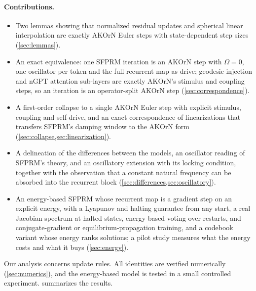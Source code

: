 \documentclass{article}
\theoremstyle{plain}
\theoremstyle{definition}
\theoremstyle{remark}
\begin{document}
\paragraph{Contributions.}
\begin{itemize}
  \item Two lemmas showing that normalized residual updates and spherical linear interpolation are
        exactly AKOrN Euler steps with state-dependent step sizes (\cref{sec:lemmas}).
  \item An exact equivalence: one SFPRM iteration is an AKOrN step with $\Omega=0$, one oscillator per
        token and the full recurrent map as drive; geodesic injection and nGPT attention sub-layers are
        exactly AKOrN's stimulus and coupling steps, so an iteration is an operator-split AKOrN step
        (\cref{sec:correspondence}).
  \item A first-order collapse to a single AKOrN Euler step with explicit stimulus, coupling and
        self-drive, and an exact correspondence of linearizations that transfers SFPRM's damping window
        to the AKOrN form (\cref{sec:collapse,sec:linearization}).
  \item A delineation of the differences between the models, an oscillator reading of SFPRM's theory,
        and an oscillatory extension with its locking condition, together with the observation that a
        constant natural frequency can be absorbed into the recurrent block
        (\cref{sec:differences,sec:oscillatory}).
  \item An energy-based SFPRM whose recurrent map is a gradient step on an explicit energy, with
        a Lyapunov and halting guarantee from any start, a real Jacobian spectrum at halted states,
        energy-based voting over restarts, and conjugate-gradient or equilibrium-propagation
        training, and a codebook variant whose energy ranks solutions; a pilot study measures what
        the energy costs and what it buys (\cref{sec:energy}).
\end{itemize}
Our analysis concerns update rules. All identities are verified numerically (\cref{sec:numerics}),
and the energy-based model is tested in a small controlled experiment. 
summarizes the results.
\end{document}
